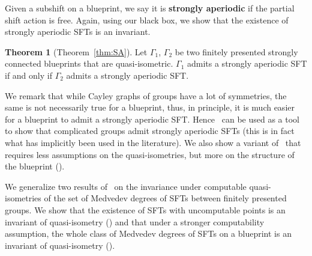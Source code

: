 \documentclass{article}
\theoremstyle{definition}
\theoremstyle{definition}
\newtheorem{thmx}{Theorem}
\newcommand{\define}[1]{\textbf{#1}}
\begin{document}
Given a subshift on a blueprint, we say it is \define{strongly aperiodic} if the partial shift action is free. Again, using our black box, we show that the existence of strongly aperiodic SFTs is an invariant. 

\begin{thmx}[Theorem~\ref{thm:SA}]\label{mainthm:SA}
    Let $\Gamma_1$, $\Gamma_2$ be two finitely presented strongly connected blueprints that are quasi-isometric. $\Gamma_1$ admits a strongly aperiodic SFT if and only if $\Gamma_2$ admits a strongly aperiodic SFT.
\end{thmx}

We remark that while Cayley graphs of groups have a lot of symmetries, the same is not necessarily true for a blueprint, thus, in principle, it is much easier for a blueprint to admit a strongly aperiodic SFT. Hence~ can be used as a tool to show that complicated groups admit strongly aperiodic SFTs (this is in fact what has implicitly been used in the literature). We also show a variant of~ that requires less assumptions on the quasi-isometries, but more on the structure of the blueprint ().

We generalize two results of~\cite[Corollary 4.24]{barbieri2024medvedev} on the invariance under computable quasi-isometries of the set of Medvedev degrees of SFTs between finitely presented groups. We show that the existence of SFTs with uncomputable points is an invariant of quasi-isometry () and that under a stronger computability assumption, the whole class of Medvedev degrees of SFTs on a blueprint is an invariant of quasi-isometry ().
\end{document}
